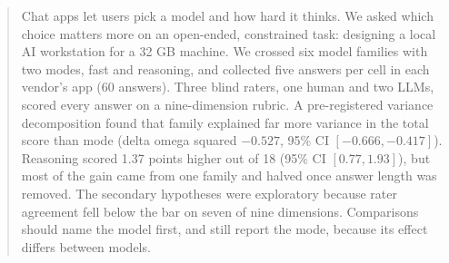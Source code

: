 \begin{abstract}
Chat apps let users pick a model and how hard it thinks. We asked which choice matters more
on an open-ended, constrained task: designing a local AI workstation for a 32 GB machine.
We crossed six model families with two modes, fast and reasoning, and collected five answers
per cell in each vendor's app (60 answers). Three blind raters, one human and two LLMs,
scored every answer on a nine-dimension rubric. A pre-registered variance decomposition
found that family explained far more variance in the total score than mode (delta omega
squared $-0.527$, 95\% CI $[-0.666, -0.417]$). Reasoning scored 1.37 points higher out of 18
(95\% CI $[0.77, 1.93]$), but most of the gain came from one family and halved once answer
length was removed. The secondary hypotheses were exploratory because rater agreement fell
below the bar on seven of nine dimensions. Comparisons should name the model first, and
still report the mode, because its effect differs between models.
\end{abstract}
